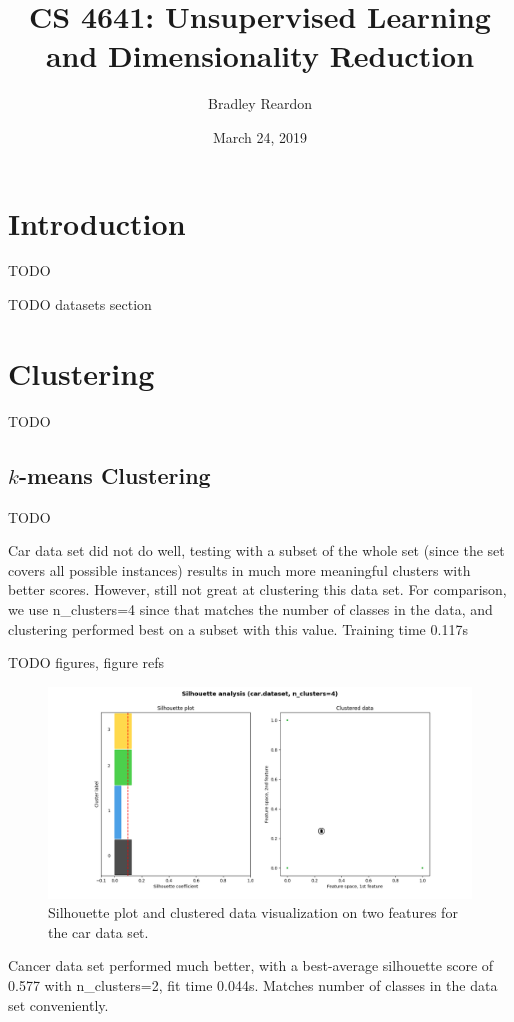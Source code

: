 \documentclass{article}
\title{\textbf{CS 4641:} Unsupervised Learning and Dimensionality Reduction}
\author{Bradley Reardon}
\date{March 24, 2019}
\begin{document}
  \maketitle

  \section{Introduction}
    TODO

    TODO datasets section

  \section{Clustering}
    TODO

    \subsection{$k$-means Clustering}
      TODO

      Car data set did not do well, testing with a subset of the whole set (since the set covers all possible instances) results in much more meaningful clusters with better scores. However, still not great at clustering this data set. For comparison, we use n\_clusters=4 since that matches the number of classes in the data, and clustering performed best on a subset with this value. Training time 0.117s

      TODO figures, figure refs 

      \begin{figure}[htb]
      \centering
      \includegraphics[width=\linewidth]{out/kmeans/car-4-clusters.png}
      \caption{Silhouette plot and clustered data visualization on two features for the car data set.}
      \label{fig:km-silhouette-car}
      \end{figure}

      Cancer data set performed much better, with a best-average silhouette score of 0.577 with n\_clusters=2, fit time 0.044s. Matches number of classes in the data set conveniently.
\end{document}
